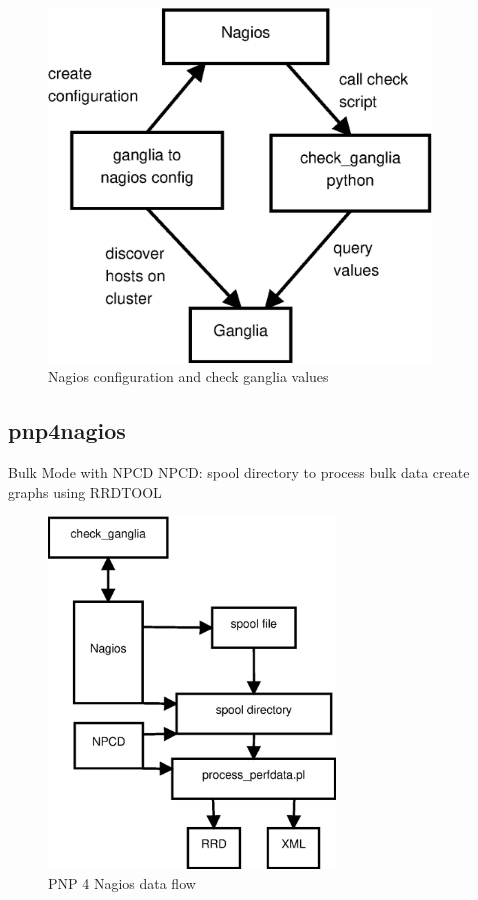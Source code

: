 \begin{figure}[htb]
\centering
 \includegraphics[width=4in]{images/nagios_check_ganglia.eps}
\caption{Nagios configuration and check ganglia values}
\label{figure:nagios_ganglia}
\end{figure}

\subsection{pnp4nagios}

Bulk Mode with NPCD
NPCD:
spool directory to process bulk data
create graphs using RRDTOOL

\begin{figure}[htb]
\centering
 \includegraphics[width=3in]{images/npcd_pnp4nagios.eps}
\caption{PNP 4 Nagios data flow}
\label{figure:pnp4nagios}
\end{figure}

